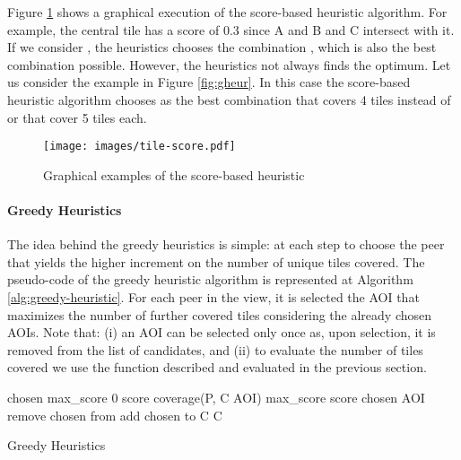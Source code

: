 \documentclass[final,10pt,a5paper]{phdimt}
\theoremstyle{definition}
\begin{document}
Figure \ref{graph:score} shows a graphical execution of the score-based heuristic algorithm. 
For example, the central tile has a score of 0.3 since A and B and C intersect with it. If we consider , the heuristics chooses the combination , which is also the best combination possible. However, the heuristics not always finds the optimum. Let us consider the example in Figure \ref{fig:gheur}. In this case the score-based heuristic algorithm chooses as the best combination  that covers 4 tiles instead of  or  that cover 5 tiles each.

\begin{figure}
\centering
\texttt{[image: images/tile-score.pdf]}
\caption{Graphical examples of the score-based heuristic}\label{graph:score}
\end{figure}



\paragraph{Greedy Heuristics}
The idea behind the greedy heuristics is simple: at each step to choose the peer that yields the higher increment on the number of unique tiles covered. The pseudo-code of the greedy heuristic algorithm is represented at Algorithm \ref{alg:greedy-heuristic}.
For each peer in the view, it is selected the AOI that maximizes the number of further covered tiles considering the already chosen AOIs. Note that: (i) an AOI can be selected only once as, upon selection, it is removed from the list of candidates, and (ii) to evaluate the number of tiles covered we use the function  described and evaluated in the previous section. 

\begin{algorithm}[tbh]


\BlankLine

\While{} 
{\label{greedy:outer}
  chosen \;
  max\_score  0\;
  {\label{greedy:inner}
    score  coverage(P, C  AOI)\;
    {
       max\_score  score\;
       chosen  AOI\;
    }
  }
  remove chosen from \;
  add chosen to C\;
}
\Return C\;
\caption{Greedy Heuristics}\label{alg:greedy-heuristic}
\end{algorithm} 
\end{document}

